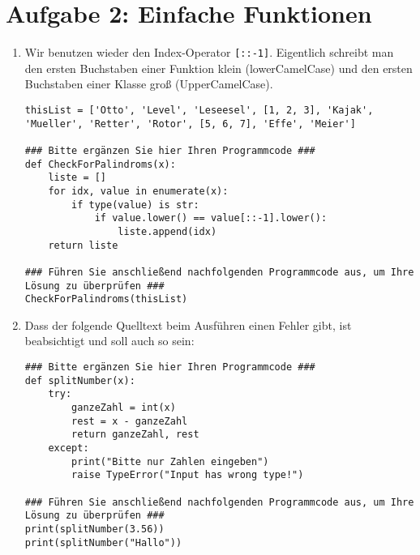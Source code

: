 \documentclass{article}
\begin{document}
	\section*{Aufgabe 2: Einfache Funktionen}
	\begin{enumerate}[label=(\alph*)]
		\item Wir benutzen wieder den Index-Operator \texttt{[::-1]}. Eigentlich schreibt man den ersten Buchstaben einer Funktion klein (lowerCamelCase) und den ersten Buchstaben einer Klasse groß (UpperCamelCase).
		\begin{lstlisting}
thisList = ['Otto', 'Level', 'Leseesel', [1, 2, 3], 'Kajak', 'Mueller', 'Retter', 'Rotor', [5, 6, 7], 'Effe', 'Meier']

### Bitte ergänzen Sie hier Ihren Programmcode ###
def CheckForPalindroms(x):
	liste = []
	for idx, value in enumerate(x):
		if type(value) is str:
			if value.lower() == value[::-1].lower():
				liste.append(idx)
	return liste

### Führen Sie anschließend nachfolgenden Programmcode aus, um Ihre Lösung zu überprüfen ###
CheckForPalindroms(thisList)
		\end{lstlisting}
		\item Dass der folgende Quelltext beim Ausführen einen Fehler gibt, ist beabsichtigt und soll auch so sein:
		\begin{lstlisting}
### Bitte ergänzen Sie hier Ihren Programmcode ###
def splitNumber(x):
	try:
		ganzeZahl = int(x)
		rest = x - ganzeZahl
		return ganzeZahl, rest
	except:
		print("Bitte nur Zahlen eingeben")
		raise TypeError("Input has wrong type!")

### Führen Sie anschließend nachfolgenden Programmcode aus, um Ihre Lösung zu überprüfen ###
print(splitNumber(3.56))
print(splitNumber("Hallo"))
		\end{lstlisting}
	\end{enumerate}
\end{document}
